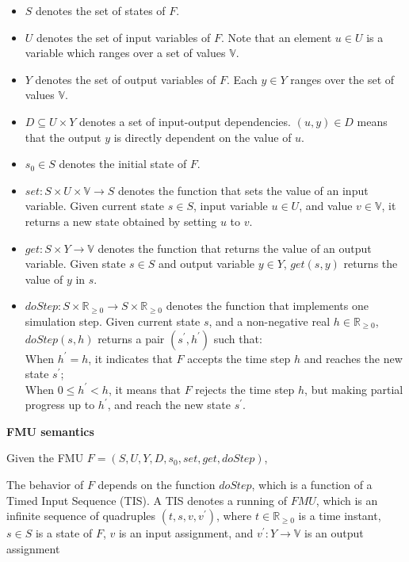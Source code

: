 \begin{itemize}
\item
$S$ denotes the set of states of $F$. 
\item
$U$ denotes the set of input variables of $F$. Note that an element $u \in U$ is a variable which ranges over a set of values $\mathbb{V}$. 
\item
$Y$ denotes the set of output variables of $F$. Each $y \in Y$ ranges over the set of values $\mathbb{V}$.
\item
$D \subseteq U \times Y$ denotes a set of input-output dependencies. $(u,y) \in D $ means that the output $y$ is directly dependent on the value of $u$. 
\item
$s_{0} \in S$ denotes the initial state of $F$.
\item
$set : S \times U \times \mathbb{V} \rightarrow S$ denotes the function that sets the value of an input variable. Given current state $s \in S$, input variable $u \in U$, and value $v \in \mathbb{V}$, it returns a new state obtained by setting $u$ to $v$.
\item
$get : S \times Y \rightarrow \mathbb{V}$ denotes the function that returns the value of an output variable. Given state $s \in S$ and output variable $y \in Y$, $get(s,y)$ returns the value of $y$ in $s$.
\item
$doStep : S \times \mathbb{R}_{\geqslant{0}} \rightarrow S \times \mathbb{R}_{\geqslant{0}}$ denotes the function that implements one simulation step. Given current state $s$, and a non-negative real $h \in \mathbb{R}_{\geqslant{0}}$, $doStep(s,h)$ returns a pair $(s^{\prime},h^{\prime})$ such that:
\\
    When $h^{\prime} = h$, it indicates that $F$ accepts the time step $h$ and reaches the new state $s^{\prime}$;
\\
    When $0 \leqslant h^{\prime} < h$, it means that $F$ rejects the time step $h$, but making partial progress up to $h^{\prime}$, and reach the new state $s^{\prime}$.
\end{itemize}
\begin{definition}
\textbf{FMU semantics}

Given the FMU $F=(S,U,Y,D,s_{0},set,get,doStep)$,
\end{definition} 
The behavior of $F$ depends on the function $doStep$, which is a function of a Timed Input Sequence (TIS).
A TIS denotes a running of $FMU$, which is an infinite sequence of quadruples $(t,s,v,v^{\prime})$, where $t \in \mathbb{R}_{\geqslant{0}}$ is a time instant, $s \in S$ is a state of $F$, $v$ is an input assignment, and $v^{\prime} : Y \rightarrow \mathbb{V}$ is an output assignment
 
